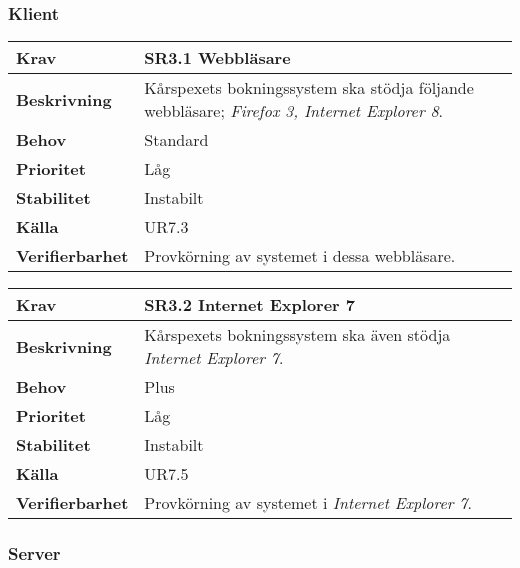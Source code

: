 \documentclass[a4paper, twoside, 11pt, titlepage]{article}
\begin{document}
		\subsubsection{Klient}


		\begin{tabular} { p{2.6cm} p{12.5cm} }
			\hline
			\sffamily\textbf{Krav} & \sffamily\textbf{SR3.1 Webbläsare } \\
			\hline
			\sffamily\textbf{Beskrivning} & Kårspexets bokningssystem ska stödja följande webbläsare; \emph{Firefox 3\underline{}, \emph{Internet Explorer 8}}.   \\
			\hline
			\sffamily\textbf{Behov} & Standard  \\
			\hline
			\sffamily\textbf{Prioritet} & Låg  \\
			\hline
			\sffamily\textbf{Stabilitet} & Instabilt  \\
			\hline
			\sffamily\textbf{Källa} & UR7.3  \\
			\hline
			\sffamily\textbf{Verifierbarhet} & Provkörning av systemet i dessa webbläsare.  \\
			\hline
		\end{tabular}
		\vspace{6mm}

		\begin{tabular} { p{2.6cm} p{12.5cm} }
			\hline
			\sffamily\textbf{Krav} & \sffamily\textbf{SR3.2 Internet Explorer 7 } \\
			\hline
			\sffamily\textbf{Beskrivning} & Kårspexets bokningssystem ska även stödja \emph{Internet Explorer 7}.  \\
			\hline
			\sffamily\textbf{Behov} & Plus  \\
			\hline
			\sffamily\textbf{Prioritet} & Låg  \\
			\hline
			\sffamily\textbf{Stabilitet} & Instabilt  \\
			\hline
			\sffamily\textbf{Källa} & UR7.5  \\
			\hline
			\sffamily\textbf{Verifierbarhet} & Provkörning av systemet i \emph{Internet Explorer 7}.  \\
			\hline
		\end{tabular}


		\subsubsection{Server}
\end{document}
